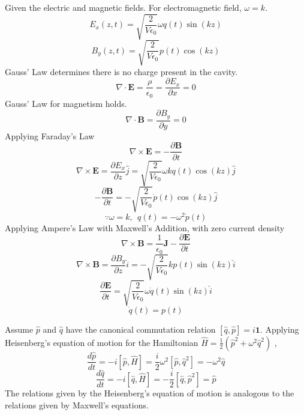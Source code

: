 \begin{sol}
Given the electric and magnetic fields. For electromagnetic field, $\omega=k$.
$$E_x(z,t)=\sqrt{\frac{2}{V\epsilon_0}}\omega q(t)\sin(kz)$$
$$B_y(z,t)=\sqrt{\frac{2}{V\epsilon_0}}p(t)\cos(kz)$$ 
Gauss' Law determines there is no charge present in the cavity.
$$\nabla\cdot\mathbf{E}=\frac{\rho}{\epsilon_0}=\frac{\partial E_x}{\partial x}=0$$ 
Gauss' Law for magnetism holds.
$$\nabla\cdot \mathbf{B}=\frac{\partial B_y}{\partial y}=0$$
Applying Faraday's Law 
$$\nabla\times\mathbf{E}=-\frac{\partial\mathbf{B}}{\partial t}$$
$$\nabla\times\mathbf{E}=\frac{\partial E_x}{\partial z}\hat j=\sqrt{\frac{2}{V\epsilon_0}}\omega k q(t)\cos(kz)\hat j$$
$$-\frac{\partial\mathbf B}{\partial t}=-\sqrt{\frac{2}{V\epsilon_0}}\dot p(t)\cos(kz)\hat j$$
$$\because\omega=k,\:\: q(t)=-\omega^2\dot p(t)$$ 
Applying Ampere's Law with Maxwell's Addition, with zero current density
$$\nabla\times\mathbf B=\frac{1}{\epsilon_0}\mathbf J-\frac{\partial\mathbf{E}}{\partial t}$$
$$\nabla\times \mathbf B=\frac{\partial B_y}{\partial z}\hat i=-\sqrt{\frac{2}{V\epsilon_0}}kp(t)\sin(kz)\hat i$$ $$\frac{\partial\mathbf{E}}{\partial t}=\sqrt{\frac{2}{V\epsilon_0}}\omega \dot q(t)\sin(kz)\hat i$$ 
$$\dot q(t)=p(t)$$

Assume $\hat p$ and $\hat q$ have the canonical commutation relation $[\hat q,\hat p]=i\mathbf 1$. Applying Heisenberg's equation of motion for the Hamiltonian $\hat H=\frac{1}{2}(\hat p^2+\omega^2\hat q^2)$ , 
$$\frac{d\hat p}{dt}=-i[\hat p,\hat H]=\frac{i}{2}\omega^2[\hat p,\hat q^2]=-\omega^2\hat q$$  
$$\frac{d\hat q}{dt}=-i[\hat q,\hat H]=-\frac{i}{2}[\hat q,\hat p^2]=\hat p$$
The relations given by the Heisenberg's equation of motion is analogous to the relations given by Maxwell's equations. 
\end{sol}